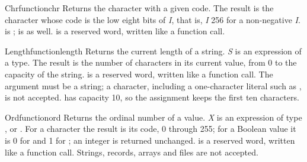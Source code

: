 \begin{LibEntry}{Chr}{function}{chr}
\LFunction Returns the character with a given code.
\LDeclaration {}
\LResultType {}
\LRemarks The result is the character whose code is the low eight bits of
\textit{I}, that is, \textit{I}  256 for a non-negative \textit{I}.
 is ;  is  as well.
 is a reserved word, written like a function call.
\LSeeAlso {}
\LExample
{}
\end{LibEntry}

\begin{LibEntry}{Length}{function}{length}
\LFunction Returns the current length of a string.
\LDeclaration {}
\LResultType {}
\LRemarks \textit{S} is an expression of a  type.  The result is
the number of characters in its current value, from 0 to the capacity of
the string.   is a reserved word, written like a
function call.
\LRestrictions The argument must be a string; a character, including a
one-character literal such as , is not accepted.
\LSeeAlso {}
\LExample
{}
 has capacity 10, so the assignment keeps the first ten characters.
\end{LibEntry}

\begin{LibEntry}{Ord}{function}{ord}
\LFunction Returns the ordinal number of a value.
\LDeclaration {}
\LResultType {}
\LRemarks \textit{X} is an expression of type ,  or
.  For a character the result is its code, 0 through 255; for a
Boolean value it is 0 for  and 1 for ; an integer is
returned unchanged.   is a reserved word, written like a
function call.
\LRestrictions Strings, records, arrays and files are not accepted.
\LSeeAlso {}
\LExample
{}
\end{LibEntry}

